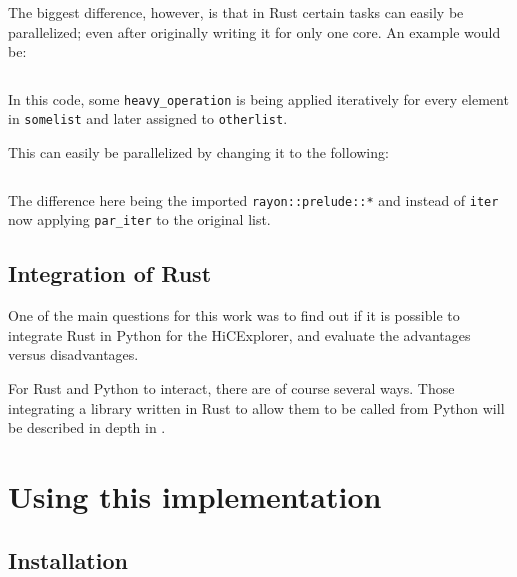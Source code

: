 The biggest difference, however, is that in Rust certain tasks can easily be
parallelized; even after originally writing it for only one core. An example
would be:

\inputminted{Rust}{code1.rs}

In this code, some \verb|heavy_operation| is being applied iteratively for every element in \verb|somelist| and later assigned to \verb|otherlist|.

This can easily be parallelized by changing it to the following:

\inputminted{Rust}{code2.rs}

The difference here being the imported \verb|rayon::prelude::*| and instead of
\verb|iter| now applying \verb|par_iter| to the original list.






\subsection{Integration of Rust}\label{sec:integration}


One of the main questions for this work was to find out if it is possible to
integrate Rust in Python for the HiCExplorer, and evaluate the advantages
versus disadvantages.


For Rust and Python to interact, there are of course several ways. Those
integrating a library written in Rust to allow them to be called from Python
will be described in depth in .










\newpage
\section{Using this implementation}\label{sec:using}



\subsection{Installation}\label{sec:install}

